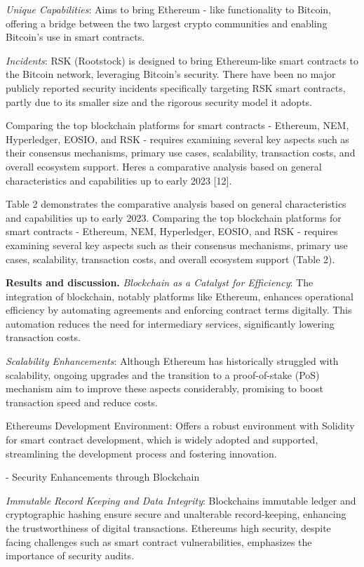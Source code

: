 \begin{multicols}{2}
\emph{Unique Capabilities}: Aims to bring Ethereum - like functionality
to Bitcoin, offering a bridge between the two largest crypto communities
and enabling Bitcoin's use in smart contracts.

\emph{Incidents}: RSK (Rootstock) is designed to bring Ethereum-like
smart contracts to the Bitcoin network, leveraging Bitcoin's security.
There have been no major publicly reported security incidents
specifically targeting RSK smart contracts, partly due to its smaller
size and the rigorous security model it adopts.

Comparing the top blockchain platforms for smart contracts - Ethereum,
NEM, Hyperledger, EOSIO, and RSK - requires examining several key
aspects such as their consensus mechanisms, primary use cases,
scalability, transaction costs, and overall ecosystem support.
Here\textquotesingle s a comparative analysis based on general
characteristics and capabilities up to early 2023 {[}12{]}.

Table 2 demonstrates the comparative analysis based on general
characteristics and capabilities up to early 2023. Comparing the top
blockchain platforms for smart contracts - Ethereum, NEM, Hyperledger,
EOSIO, and RSK - requires examining several key aspects such as their
consensus mechanisms, primary use cases, scalability, transaction costs,
and overall ecosystem support (Table 2).

{\bfseries Results and discussion.} \emph{Blockchain as a Catalyst for
Efficiency}: The integration of blockchain, notably platforms like
Ethereum, enhances operational efficiency by automating agreements and
enforcing contract terms digitally. This automation reduces the need for
intermediary services, significantly lowering transaction costs.

\emph{Scalability Enhancements}: Although Ethereum has historically
struggled with scalability, ongoing upgrades and the transition to a
proof-of-stake (PoS) mechanism aim to improve these aspects
considerably, promising to boost transaction speed and reduce costs.

Ethereum\textquotesingle s Development Environment: Offers a robust
environment with Solidity for smart contract development, which is
widely adopted and supported, streamlining the development process and
fostering innovation.

- Security Enhancements through Blockchain

\emph{Immutable Record Keeping and Data Integrity}:
Blockchain\textquotesingle s immutable ledger and cryptographic hashing
ensure secure and unalterable record-keeping, enhancing the
trustworthiness of digital transactions. Ethereum\textquotesingle s high
security, despite facing challenges such as smart contract
vulnerabilities, emphasizes the importance of security audits.


\end{multicols}
